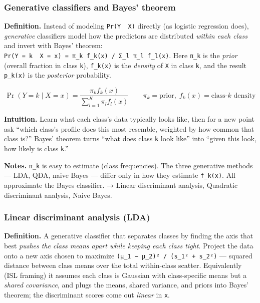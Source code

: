 \documentclass[
  10pt,
  letterpaper,
  onecolumn]{article}
\begin{document}
\hypertarget{generative-classifiers-and-bayes-theorem}{%
\subsubsection{Generative classifiers and Bayes'
theorem}\label{generative-classifiers-and-bayes-theorem}}

\textbf{Definition.} Instead of modeling \texttt{Pr(Y\ \textbar{}\ X)}
directly (as logistic regression does), \emph{generative} classifiers
model how the predictors are distributed \emph{within each class} and
invert with Bayes' theorem:
\texttt{Pr(Y\ =\ k\ \textbar{}\ X\ =\ x)\ =\ π\_k\ f\_k(x)\ /\ Σ\_l\ π\_l\ f\_l(x)}.
Here \texttt{π\_k} is the \emph{prior} (overall fraction in class
\texttt{k}), \texttt{f\_k(x)} is the \emph{density} of \texttt{X} in
class \texttt{k}, and the result \texttt{p\_k(x)} is the
\emph{posterior} probability.

\begin{equation*}
\Pr(Y=k\mid X=x)=\frac{\pi_k f_k(x)}{\sum_{l=1}^{K}\pi_l f_l(x)}
\qquad
\pi_k=\text{prior},\; f_k(x)=\text{class-}k\text{ density}
\end{equation*}

\textbf{Intuition.} Learn what each class's data typically looks like,
then for a new point ask ``which class's profile does this most
resemble, weighted by how common that class is?'' Bayes' theorem turns
``what does class \texttt{k} look like'' into ``given this look, how
likely is class \texttt{k}.''

\textbf{Notes.} \texttt{π\_k} is easy to estimate (class frequencies).
The three generative methods --- LDA, QDA, naive Bayes --- differ only
in how they estimate \texttt{f\_k(x)}. All approximate the Bayes
classifier. → Linear discriminant analysis, Quadratic discriminant
analysis, Naive Bayes.

\hypertarget{linear-discriminant-analysis-lda}{%
\subsubsection{Linear discriminant analysis
(LDA)}\label{linear-discriminant-analysis-lda}}

\textbf{Definition.} A generative classifier that separates classes by
finding the axis that best \emph{pushes the class means apart while
keeping each class tight}. Project the data onto a new axis chosen to
maximize \texttt{(μ\_1\ −\ μ\_2)²\ /\ (s\_1²\ +\ s\_2²)} --- squared
distance between class means over the total within-class scatter.
Equivalently (ISL framing) it assumes each class is Gaussian with
class-specific means but a \emph{shared covariance}, and plugs the
means, shared variance, and priors into Bayes' theorem; the discriminant
scores come out \emph{linear} in \texttt{x}.
\end{document}
